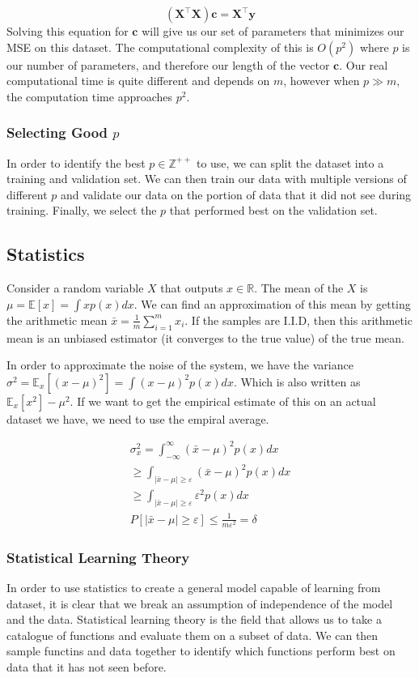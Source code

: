 \documentclass[11pt]{article}
\begin{document}
\begin{equation}
    (\textbf{X}^\top \textbf{X} ) \textbf{c} = \textbf{X}^\top \textbf{y}
\end{equation}
Solving this equation for $\textbf{c}$ will give us our set of parameters that minimizes our MSE on this dataset.
The computational complexity of this is $O(p^2)$ where $p$ is our number of parameters, and therefore our length of the vector $\textbf{c}$.
Our real computational time is quite different and depends on $m$, however when $p \gg m$, the computation time approaches $p^2$.

\subsubsection{Selecting Good $p$}
In order to identify the best $p \in \mathbb{Z}^{++}$ to use, we can split the dataset into a training and validation set.
We can then train our data with multiple versions of different $p$ and validate our data on the portion of data that it did not see during training.
Finally, we select the $p$ that performed best on the validation set.

\subsection{Statistics}
Consider a random variable $X$ that outputs $x \in \mathbb{R}$.
The mean of the $X$ is  $\mu = \mathbb{E} [x] = \int x p(x) dx$.
We can find an approximation of this mean by getting the arithmetic mean $\bar{x} = \frac{1}{m} \sum_{i=1}^{m}x_i$.
If the samples are I.I.D, then  this arithmetic mean is an unbiased estimator (it converges to the true value) of the true mean.

In order to approximate the noise of the system, we have the variance $\sigma^2 = \mathbb{E}_x [(x-\mu)^2] = \int (x-\mu)^2 p(x) dx$.
Which is also written as $\mathbb{E}_x [x^2] - \mu^2$.
If we want to get the empirical estimate of this on an actual dataset we have, we need to use the empiral average.

\begin{gather}
    \sigma_x^2 = \int_{-\infty}^{\infty} (\bar{x} - \mu)^2 p(x) dx \\
    \geq \int_{|\bar{x}- \mu| \geq \varepsilon} (\bar{x} - \mu)^2 p(x) dx \\
    \geq \int_{|\bar{x}- \mu| \geq \varepsilon} \varepsilon^2 p(x) dx \\
    P [|\bar{x} - \mu| \geq \varepsilon] \leq \frac{1}{m \varepsilon^2} = \delta
\end{gather}

\subsubsection{Statistical Learning Theory}
In order to use statistics to create a general model capable of learning from dataset, it is clear that we break an assumption of independence of the model and the data.
Statistical learning theory is the field that allows us to take a catalogue of functions and evaluate them on a subset of data.
We can then sample functins and data together to identify which functions perform best on data that it has not seen before.
\end{document}

